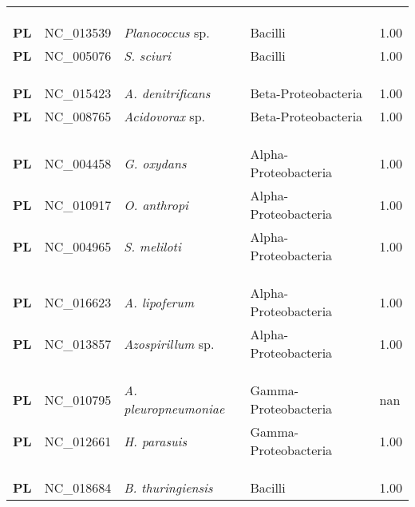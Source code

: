 \begin{adjustwidth}{-3cm}{2cm}
{\begin{supertabular}{>{\bfseries}l|p{0.1\textwidth}p{0.14\textwidth}l|l}
\\
\\
\hline\\
PL & NC\_013539 & \textit{Planococcus} sp. & Bacilli & 1.00\\
PL & NC\_005076 & \textit{S. sciuri} & Bacilli & 1.00\\
\\
\\
\hline\\
PL & NC\_015423 & \textit{A. denitrificans} & Beta-Proteobacteria & 1.00\\
PL & NC\_008765 & \textit{Acidovorax} sp. & Beta-Proteobacteria & 1.00\\
\\
\\
\hline\\
PL & NC\_004458 & \textit{G. oxydans} & Alpha-Proteobacteria & 1.00\\
PL & NC\_010917 & \textit{O. anthropi} & Alpha-Proteobacteria & 1.00\\
PL & NC\_004965 & \textit{S. meliloti} & Alpha-Proteobacteria & 1.00\\
\\
\\
\hline\\
PL & NC\_016623 & \textit{A. lipoferum} & Alpha-Proteobacteria & 1.00\\
PL & NC\_013857 & \textit{Azospirillum} sp. & Alpha-Proteobacteria & 1.00\\
\\
\\
\hline\\
PL & NC\_010795 & \textit{A. pleuropneumoniae} & Gamma-Proteobacteria & nan\\
PL & NC\_012661 & \textit{H. parasuis} & Gamma-Proteobacteria & 1.00\\
\\
\\
\hline\\
PL & NC\_018684 & \textit{B. thuringiensis} & Bacilli & 1.00\\

\end{supertabular}}
\end{adjustwidth}
